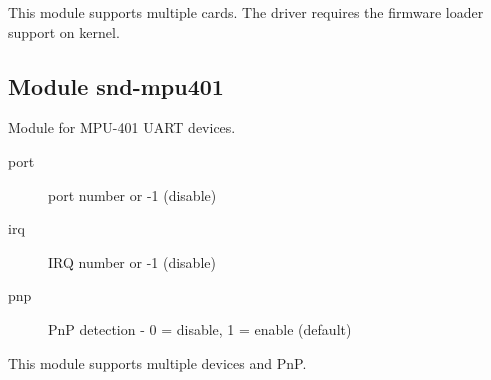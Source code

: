 \documentclass[a4paper,8pt,english]{sphinxmanual}
\begin{document}
This module supports multiple cards.
The driver requires the firmware loader support on kernel.


\subsection{Module snd-mpu401}
\label{sound/alsa-configuration:module-snd-mpu401}
Module for MPU-401 UART devices.
\begin{description}
\item[{port}] \leavevmode
port number or -1 (disable)

\item[{irq}] \leavevmode
IRQ number or -1 (disable)

\item[{pnp}] \leavevmode
PnP detection - 0 = disable, 1 = enable (default)

\end{description}

This module supports multiple devices and PnP.
\end{document}
